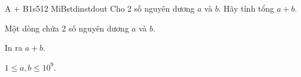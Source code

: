 \begin{statement}{A + B}{1s}{512 MiB}{stdin}{stdout}
Cho 2 số nguyên dương $a$ và $b$. Hãy tính tổng $a + b$.

\InputFile
Một dòng chứa 2 số nguyên dương $a$ và $b$.

\OutputFile
In ra $a + b$.

\Constraints
$1 \le a, b \le 10^9$.












\end{statement}